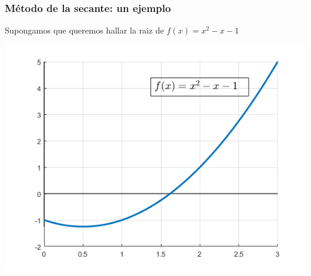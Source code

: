 \documentclass[xcolor=svgnames]{beamer} %
\theoremstyle{plain}
\theoremstyle{definition}
\begin{document}
\begin{frame}
\frametitle{Método de la secante: un ejemplo}

Supongamos que queremos hallar la raiz de $f(x) = x^2-x-1$



\begin{minipage}{.7\linewidth}
\includegraphics[width=\linewidth]{sec_example/f.png} 

\end{minipage} \begin{minipage}{.25\linewidth}
\end{minipage}

\end{frame}
\end{document}
